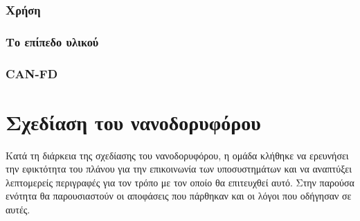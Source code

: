 \documentclass[a4paper,nobib,justified]{tufte-book}
\begin{document}
\subsection{Χρήση}
\subsection{Το επίπεδο υλικού}
\subsection{CAN-FD}

\chapter{Σχεδίαση του νανοδορυφόρου}
\label{design-choices}
Κατά τη διάρκεια της σχεδίασης του νανοδορυφόρου, η ομάδα κλήθηκε να ερευνήσει την εφικτότητα του πλάνου για την επικοινωνία των υποσυστημάτων και να αναπτύξει λεπτομερείς περιγραφές για τον τρόπο με τον οποίο θα επιτευχθεί αυτό. Στην παρούσα ενότητα θα παρουσιαστούν οι αποφάσεις που πάρθηκαν και οι λόγοι που οδήγησαν σε αυτές.
\end{document}
